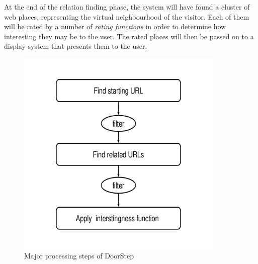 \documentclass[a4paper]{danarticle}
\theoremstyle{remark}
\begin{document}
      At the end of the relation finding phase, the system will have found a
      cluster of web places, representing the virtual neighbourhood of the
      visitor. Each of them will be rated by a number of \textit{rating
      functions} in order to determine how interesting they may be to the user.
      The rated places will then be passed on to a display system that presents
      them to the user.
      \begin{figure}[ht]
        \centering
	\includegraphics[width=10cm]{steps_overview}
	\caption{Major processing steps of DoorStep}
	\label{steps_overview}
      \end{figure}
\end{document}
